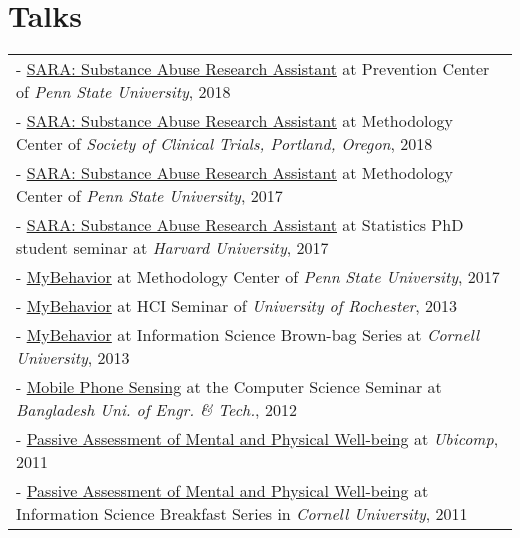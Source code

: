 \documentclass[10pt,fullpage]{article}
\begin{document}
\vspace{1em}
\section*{\textbf{Talks}}
\vspace{-0.5em}
\begin{longtable}{>{\everypar{\hangindent0.5in}}p{6in}}
	- \underline{SARA: Substance Abuse Research Assistant} at Prevention Center of \textit{Penn State University}, 2018\\
	- \underline{SARA: Substance Abuse Research Assistant} at Methodology Center of \textit{Society of Clinical Trials, Portland, Oregon}, 2018\\
	- \underline{SARA: Substance Abuse Research Assistant} at Methodology Center of \textit{Penn State University}, 2017\\
	- \underline{SARA: Substance Abuse Research Assistant} at Statistics PhD student seminar at \textit{Harvard University}, 2017\\
	- \underline{MyBehavior} at Methodology Center of \textit{Penn State University}, 2017\\
	- \underline{MyBehavior} at HCI Seminar of \textit{University of Rochester}, 2013\\
	- \underline{MyBehavior} at Information Science Brown-bag Series at \textit{Cornell University}, 2013\\
	- \underline{Mobile Phone Sensing} at the Computer Science Seminar at \textit{Bangladesh Uni. of Engr. \& Tech.}, 2012\\
	- \underline{Passive Assessment of Mental and Physical Well-being} at \textit{Ubicomp}, 2011\\
	- \underline{Passive Assessment of Mental and Physical Well-being} at Information Science Breakfast Series in \textit{Cornell University}, 2011\\
\end{longtable}
\end{document}
